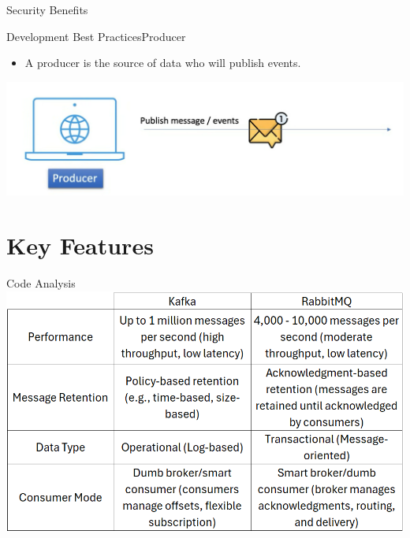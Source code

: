 \documentclass{beamer}
\begin{document}
\begin{frame}{Security Benefits}
 
\end{frame}

\begin{frame}{Development Best Practices}{Producer}
  \begin{itemize}
    \item A producer is the source of data who will publish events.
  \end{itemize}
  \vspace*{1.5em}
  \includegraphics[scale=0.192]{fig/producer.png}
\end{frame}


\section[Key Features]{Key Features}

\begin{frame}{Code Analysis}
  \includegraphics[width=1.02\textwidth]{fig/vs1.png}
\end{frame}
\end{document}
